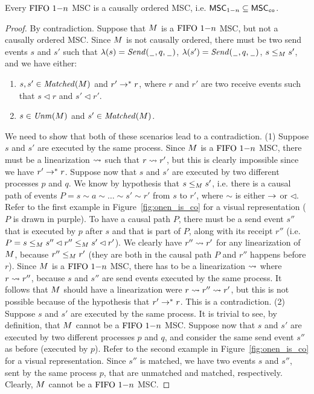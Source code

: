 \begin{proposition} \label{prop:onen_is_co}
	Every $\text{FIFO } 1\mathsf{-}n$ MSC is a causally ordered MSC, i.e. $\mathsf{MSC}_{1\mathsf{-}n} \subseteq \mathsf{MSC}_{\mathtt{co}}$.
\end{proposition}
\begin{proof}
By contradiction. Suppose that $M$ is a $\text{FIFO } 1\mathsf{-}n$ MSC, but not a causally ordered MSC. Since $M$ is not causally ordered, there must be two send events $s$ and $s'$ such that $\lambda(s)={\mathit{Send}(\hspace{0.1em}\underline{\hspace{0.5em}}\hspace{0.1em},q,\hspace{0.1em}\underline{\hspace{0.5em}}\hspace{0.1em})}$, $\lambda(s')={\mathit{Send}(\hspace{0.1em}\underline{\hspace{0.5em}}\hspace{0.1em},q,\hspace{0.1em}\underline{\hspace{0.5em}}\hspace{0.1em})}$, $s \le_M s'$, and we have either:
\begin{enumerate}\itemsep=0.5ex
	\item $s,s' \in \mathit{Matched}(M)$ and $r' \to^* r$, where $r$ and $r'$ are two receive events such that $s \lhd r$ and $s' \lhd r'$.
	\item  $s \in \mathit{Unm}(M)$ and $s' \in \mathit{Matched}(M)$.
\end{enumerate}
We need to show that both of these scenarios lead to a contradiction. (1) Suppose $s$ and $s'$ are executed by the same process. Since $M$ is a $\text{FIFO } 1\mathsf{-}n$ MSC, there must be a linearization $\rightsquigarrow$ such that $r \rightsquigarrow r'$, but this is clearly impossible since we have $r' \to^* r$. Suppose now that $s$ and $s'$ are executed by two different processes $p$ and $q$. We know by hypothesis that $s \le_M s'$, i.e. there is a causal path of events $P = s \sim a \sim \dots \sim s' \sim r'$ from $s$ to $r'$, where $\sim$ is either $\to$ or $\lhd$. Refer to the first example in Figure~\ref{fig:onen_is_co} for a visual representation ($P$ is drawn in purple). To have a causal path $P$, there must be a send event $s''$ that is executed by $p$ after $s$ and that is part of $P$, along with its receipt $r''$ (i.e. $P = s \le_M s'' \lhd r'' \le_M s' \lhd r'$). We clearly have $r'' \rightsquigarrow r'$ for any linearization of $M$, because $r'' \le_M r'$ (they are both in the causal path $P$ and $r''$ happens before $r$). Since $M$ is a $\text{FIFO } 1\mathsf{-}n$ MSC, there has to be a linearization $\rightsquigarrow$ where $r \rightsquigarrow r''$, because $s$ and $s''$ are send events executed by the same process. It follows that $M$ should have a linearization were $r \rightsquigarrow r'' \rightsquigarrow r'$, but this is not possible because of the hypothesis that $r' \to^* r$. This is a contradiction. (2) Suppose $s$ and $s'$ are executed by the same process. It is trivial to see, by definition, that $M$ cannot be a $\text{FIFO } 1\mathsf{-}n$ MSC. Suppose now that $s$ and $s'$ are executed by two different processes $p$ and $q$, and consider the same send event $s''$ as before (executed by $p$). Refer to the second example in Figure~\ref{fig:onen_is_co} for a visual representation. Since $s''$ is matched, we have two events $s$ and $s''$, sent by the same process $p$, that are unmatched and matched, respectively. Clearly, $M$ cannot be a $\text{FIFO } 1\mathsf{-}n$ MSC.
\end{proof}
